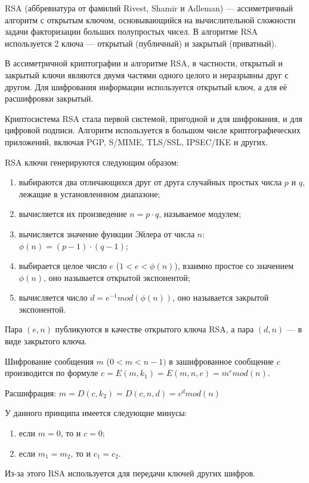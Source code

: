 RSA (аббревиатура от фамилий Rivest, Shamir и Adleman) --- ассиметричный алгоритм с открытым ключом, основывающийся на вычислительной сложности задачи факторизации больших полупростых чисел. В алгоритме RSA используется 2 ключа --- открытый (публичный) и закрытый (приватный).

В ассиметричной криптографии и алгоритме RSA, в частности, открытый и закрытый ключи являются двумя частями одного целого и неразрывны друг с другом. Для шифрования информации используется открытый ключ, а для её расшифровки закрытый.

Криптосистема RSA стала первой системой, пригодной и для шифрования, и для цифровой подписи. Алгоритм используется в большом числе криптографических приложений, включая PGP, S/MIME, TLS/SSL, IPSEC/IKE и других.

RSA ключи генерируются следующим образом:
\begin{enumerate}[label=\arabic*)]
	\item выбираются два отличающихся друг от друга случайных простых числа $p$ и $q$, лежащие в установленнном диапазоне;
	\item вычисляется их произведение $n = p \cdot q$, называемое модулем;
	\item вычисляется значение функции Эйлера от числа $n$: $\phi(n) = (p - 1)\cdot (q - 1)$;
	\item выбирается целое число $e$ ($1 < e < \phi(n)$), взаимно простое со значением $\phi(n)$, оно называется открытой экспонентой;
	\item вычисляется число $d  = e^{-1} mod (\phi(n))$, оно называется закрытой экспонентой.
\end{enumerate}

Пара $(e, n)$ публикуются в качестве открытого ключа RSA, а пара $(d, n)$ --- в виде закрытого ключа.


Шифрование сообщения $m$ ($0 < m < n - 1)$ в зашифрованное сообщение $c$ производится по формуле $ c = E(m, k_1) = E(m, n, e) = m^{e} mod (n)$.

Расшифрация: $m = D(c, k_2) = D(c, n, d) = c^{d} mod (n)$

У данного принципа имеется следующие минусы:
\begin{enumerate}[label=\arabic*)]
	\item если $m = 0$, то и $c = 0$;
	\item если $m_1 = m_2$, то и $c_1 = c_2$.
\end{enumerate}

Из-за этого RSA используется для передачи ключей других шифров.

